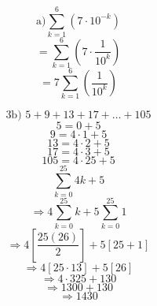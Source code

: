 \documentclass{article}
\begin{document}
\[
\text{a)} \sum_{k=1}^{6} (7 \cdot 10^{-k})
\]
\[
= \sum_{k=1}^{6} (7 \cdot \frac{1}{10^k})
\]
\[
= 7 \sum_{k=1}^{6} (\frac{1}{10^k})
\]

\[ \text{3b) } 5 + 9 + 13 + 17 + \dots + 105 \]
\[ 5 = 0 + 5 \]
\[ 9 = 4 \cdot 1 + 5 \]
\[ 13 = 4 \cdot 2 + 5 \]
\[ 17 = 4 \cdot 3 + 5 \]
\[ 105 = 4 \cdot 25 + 5 \]
\[ \sum_{k=0}^{25} 4k + 5 \]
\[ \Rightarrow 4 \sum_{k=0}^{25} k + 5 \sum_{k=0}^{25} 1 \]
\[ \Rightarrow 4 \left[ \frac{25(26)}{2} \right] + 5 [25 + 1] \]
\[ \Rightarrow 4 [25 \cdot 13] + 5 [26] \]
\[ \Rightarrow 4 \cdot 325 + 130 \]
\[ \Rightarrow 1300 + 130 \]
\[ \Rightarrow 1430 \]
\end{document}
